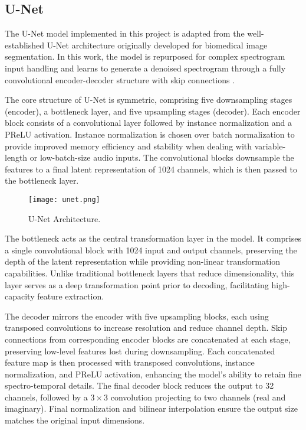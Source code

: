 \subsection{U-Net}
\label{sec:unet}

The U-Net model implemented in this project is adapted from the well-established U-Net architecture originally developed for biomedical image segmentation. In this work, the model is repurposed for complex spectrogram input handling and learns to generate a denoised spectrogram through a fully convolutional encoder-decoder structure with skip connections \cite{ronneberger2015unet}.

The core structure of U-Net is symmetric, comprising five downsampling stages (encoder), a bottleneck layer, and five upsampling stages (decoder). Each encoder block consists of a convolutional layer followed by instance normalization and a PReLU activation. Instance normalization is chosen over batch normalization to provide improved memory efficiency and stability when dealing with variable-length or low-batch-size audio inputs. The convolutional blocks downsample the features to a final latent representation of 1024 channels, which is then passed to the bottleneck layer.

\begin{figure}[h]
    \centering
    \texttt{[image: unet.png]}
    \caption{\label{fig:unet}U-Net Architecture.}
\end{figure}

The bottleneck acts as the central transformation layer in the model. It comprises a single convolutional block with 1024 input and output channels, preserving the depth of the latent representation while providing non-linear transformation capabilities. Unlike traditional bottleneck layers that reduce dimensionality, this layer serves as a deep transformation point prior to decoding, facilitating high-capacity feature extraction.

The decoder mirrors the encoder with five upsampling blocks, each using transposed convolutions to increase resolution and reduce channel depth. Skip connections from corresponding encoder blocks are concatenated at each stage, preserving low-level features lost during downsampling. Each concatenated feature map is then processed with transposed convolutions, instance normalization, and PReLU activation, enhancing the model's ability to retain fine spectro-temporal details. The final decoder block reduces the output to 32 channels, followed by a $3 \times 3$ convolution projecting to two channels (real and imaginary). Final normalization and bilinear interpolation ensure the output size matches the original input dimensions.

